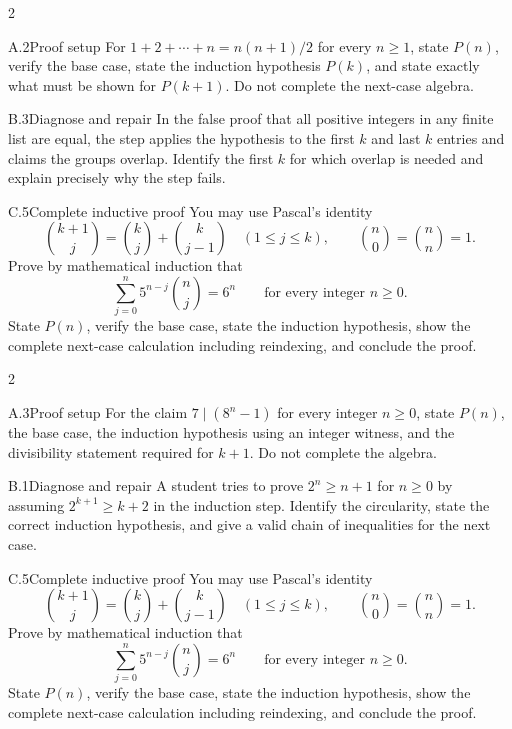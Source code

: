 \documentclass[9pt]{extarticle}
\begin{document}
\CoreWorkArea
\FormBreak
{}
\begin{multicols}{2}
\begin{CompactCoreProblem}{A.2}{Proof setup}
For $1+2+\cdots+n=n(n+1)/2$ for every $n\ge1$, state $P(n)$, verify the base case, state the induction hypothesis $P(k)$, and state exactly what must be shown for $P(k+1)$. Do not complete the next-case algebra.
\end{CompactCoreProblem}
\begin{CompactCoreProblem}{B.3}{Diagnose and repair}
In the false proof that all positive integers in any finite list are equal, the step applies the hypothesis to the first $k$ and last $k$ entries and claims the groups overlap. Identify the first $k$ for which overlap is needed and explain precisely why the step fails.
\end{CompactCoreProblem}
\end{multicols}
\begin{CompactCoreProblem}{C.5}{Complete inductive proof}
You may use Pascal's identity
\[
\binom{k+1}{j}=\binom{k}{j}+\binom{k}{j-1}
\quad(1\le j\le k),\qquad
\binom{n}{0}=\binom{n}{n}=1.
\]
Prove by mathematical induction that
\[
\sum_{j=0}^{n} 5^{n-j}\binom{n}{j}=6^n\qquad\text{for every integer }n\ge0.
\]
State $P(n)$, verify the base case, state the induction hypothesis, show the complete next-case calculation including reindexing, and conclude the proof.
\end{CompactCoreProblem}
\CoreWorkArea
\FormBreak
{}
\begin{multicols}{2}
\begin{CompactCoreProblem}{A.3}{Proof setup}
For the claim $7\mid(8^n-1)$ for every integer $n\ge0$, state $P(n)$, the base case, the induction hypothesis using an integer witness, and the divisibility statement required for $k+1$. Do not complete the algebra.
\end{CompactCoreProblem}
\begin{CompactCoreProblem}{B.1}{Diagnose and repair}
A student tries to prove $2^n\ge n+1$ for $n\ge0$ by assuming $2^{k+1}\ge k+2$ in the induction step. Identify the circularity, state the correct induction hypothesis, and give a valid chain of inequalities for the next case.
\end{CompactCoreProblem}
\end{multicols}
\begin{CompactCoreProblem}{C.5}{Complete inductive proof}
You may use Pascal's identity
\[
\binom{k+1}{j}=\binom{k}{j}+\binom{k}{j-1}
\quad(1\le j\le k),\qquad
\binom{n}{0}=\binom{n}{n}=1.
\]
Prove by mathematical induction that
\[
\sum_{j=0}^{n} 5^{n-j}\binom{n}{j}=6^n\qquad\text{for every integer }n\ge0.
\]
State $P(n)$, verify the base case, state the induction hypothesis, show the complete next-case calculation including reindexing, and conclude the proof.
\end{CompactCoreProblem}
\CoreWorkArea
\end{document}
